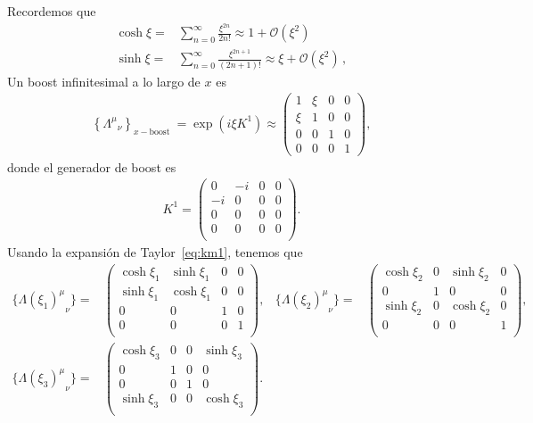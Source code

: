 \begin{frame}
  Recordemos que
\begin{align}
  \cosh\xi=&\sum_{n=0}^{\infty}\frac{\xi^{2n}}{2n!}\approx 1+\mathcal{O}(\xi^2)\nonumber\\
  \sinh\xi=&\sum_{n=0}^{\infty}\frac{\xi^{2n+1}}{(2n+1)!}\approx \xi+\mathcal{O}(\xi^2)\,,
\end{align}
  Un boost infinitesimal a lo largo de $x$ es
\begin{align}
  \left\{{\Lambda^\mu}_{\nu}\right\}_{x-\text{boost }}=\exp \left( i\xi  K^1 \right)\approx
  \begin{pmatrix}
    1&\xi&0&0\\
    \xi&1&0&0\\
    0&0&1&0\\
    0&0&0&1
  \end{pmatrix},
\end{align}
donde el generador de boost es
\begin{align}
 K^1= \begin{pmatrix}
    0 & -i & 0 & 0\\
   -i & 0  & 0 & 0\\
   0 & 0 &  0 & 0\\
    0 & 0 &  0 & 0\\ 
  \end{pmatrix}.
\end{align}
Usando la expansión de Taylor~\eqref{eq:km1},
tenemos que
\begin{align}
  \label{eq:Lximunu}
  \{{\Lambda(\xi_1)^{\mu}}_{\nu}\}=&
    \begin{pmatrix}
    \cosh\xi_1 & \sinh\xi_1 & 0  & 0\\
    \sinh\xi_1 & \cosh\xi_1 & 0  & 0\\
     0       &   0      & 1  & 0\\
     0       &   0      & 0  & 1\\
  \end{pmatrix},&
  \{{\Lambda(\xi_2)^{\mu}}_{\nu}\}=&
    \begin{pmatrix}
    \cosh\xi_2 & 0 & \sinh\xi_2  & 0\\
            0  & 1 & 0           & 0\\
     \sinh\xi_2&   0      & \cosh\xi_2  & 0\\
     0       &   0      & 0  & 1\\
  \end{pmatrix}, \nonumber\\
 \{{\Lambda(\xi_3)^{\mu}}_{\nu}\}=&
    \begin{pmatrix}
    \cosh\xi_3 & 0 & 0  & \sinh\xi_3\\
            0  & 1 & 0           & 0\\
          0 &   0      & 1  & 0\\
     \sinh\xi_3      &   0      & 0  & \cosh\xi_3\\
  \end{pmatrix}. &&
\end{align}



\end{frame}
